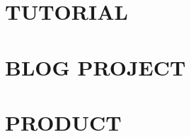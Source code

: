 \documentclass[10pt]{book}
\begin{document}

\frontmatter

\tableofcontents
\mainmatter

\part{TUTORIAL}











\part{BLOG PROJECT}






\part{PRODUCT}






\backmatter
\end{document}

